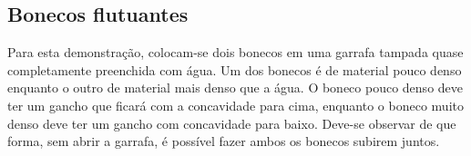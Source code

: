 \subsection{Bonecos flutuantes}
Para esta demonstração, colocam-se dois bonecos em uma garrafa tampada quase
completamente preenchida com água. Um dos bonecos é de material pouco denso
enquanto o outro de material mais denso que a água. O boneco pouco denso deve
ter um gancho que ficará com a concavidade para cima, enquanto o boneco muito
denso deve ter um gancho com concavidade para baixo. Deve-se observar de que
forma, sem abrir a garrafa, é possível fazer ambos os bonecos subirem juntos. 


